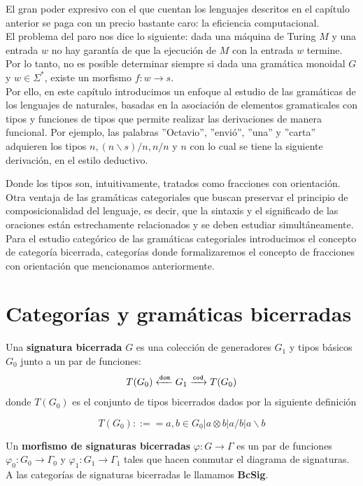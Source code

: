 \documentclass[../main.tex]{subfiles}
\begin{document}
    El gran poder expresivo con el que cuentan los lenguajes descritos en el capítulo anterior se paga con un precio bastante caro: la eficiencia computacional. \\
    El problema del paro nos dice lo siguiente: dada una máquina de Turing $M$ y una entrada $w$ no hay garantía de que la ejecución de $M$ con la entrada $w$ termine. Por lo tanto, no es posible determinar siempre si dada una gramática monoidal $G$ y $w \in \Sigma^*$, existe un morfismo $f:w \to s$. \\
    Por ello, en este capítulo introducimos un enfoque al estudio de las gramáticas de los lenguajes de naturales, basadas en la asociación de elementos gramaticales con tipos y funciones de tipos que permite realizar las derivaciones de manera funcional. Por ejemplo, las palabras ''Octavio'', ''envió'', ''una'' y ''carta'' adquieren los tipos $n, (n \backslash s)/n, n/n$ y $n$ con lo cual se tiene la siguiente derivación, en el estilo deductivo.
    \begin{center}
	\begin{prooftree}    
	\end{prooftree}
    \end{center}
    Donde los tipos son, intuitivamente, tratados como fracciones con orientación. Otra ventaja de las gramáticas categoriales que buscan preservar el principio de composicionalidad del lenguaje, es decir, que la sintaxis y el significado de las oraciones están estrechamente relacionados y se deben estudiar simultáneamente. \\
    Para el estudio categórico de las gramáticas categoriales introducimos el concepto de categoría bicerrada, categorías donde formalizaremos el concepto de fracciones con orientación que mencionamos anteriormente. 
    
    \section{Categorías y gramáticas bicerradas}
    
	\begin{dfn}
	Una \textbf{signatura bicerrada} $G$ es una colección de generadores $G_1$ y tipos básicos $G_0$ junto a un par de funciones: \\
		$$\signature{G_1}{T(G_0)}$$
	donde $T(G_0)$ es el conjunto de tipos bicerrados dados por la siguiente definición
	
	$$T(G_0) ::== a, b \in G_0 | a \otimes b | a/b | a \backslash b$$
	
	Un \textbf{morfismo de signaturas bicerradas} $\varphi : G \to \Gamma$ es un par de funciones $\varphi_0 : G_0 \to \Gamma_0$ y $\varphi_1 : G_1 \to \Gamma_1$ tales que hacen conmutar el diagrama de signaturas. A las categorías de signaturas bicerradas le llamamos \textbf{BcSig}. \\
	\end{dfn}
	
\end{document}
